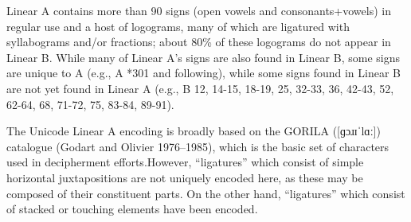 Linear A contains more than 90 signs (open vowels and consonants+vowels) in regular use and a host of
logograms, many of which are ligatured with syllabograms and/or fractions; about 80\% of these
logograms do not appear in Linear B. While many of Linear A’s signs are also found in Linear B, some
signs are unique to A (e.g., A *301 and following), while some signs found in Linear B are not yet found
in Linear A (e.g., B 12, 14-15, 18-19, 25, 32-33, 36, 42-43, 52, 62-64, 68, 71-72, 75, 83-84, 89-91).

The Unicode Linear A encoding is broadly based on the GORILA ([{\arial ɡɔɹɪˈlɑː}]) catalogue
(Godart and Olivier 1976–1985), which is the basic set of characters used in decipherment efforts.However, “ligatures” which consist of simple horizontal juxtapositions are not uniquely encoded here, as
these may be composed of their constituent parts. On the other hand, “ligatures” which consist of stacked
or touching elements have been encoded. 








